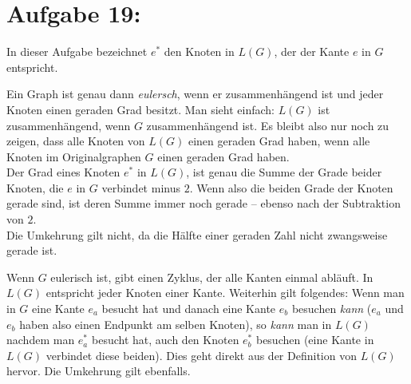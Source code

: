 \documentclass[11pt]{scrartcl} %
\begin{document}
\newpage
\section*{Aufgabe 19:}
In dieser Aufgabe bezeichnet $e^*$ den Knoten in $L(G)$, der der Kante $e$ in $G$ entspricht.

\begin{compactenum}[(a)]
\item Ein Graph ist genau dann \emph{eulersch}, wenn er zusammenhängend ist und jeder Knoten einen geraden Grad besitzt. Man sieht einfach: $L(G)$ ist zusammenhängend, wenn $G$ zusammenhängend ist. Es bleibt also nur noch zu zeigen, dass alle Knoten von $L(G)$ einen geraden Grad haben, wenn alle Knoten im Originalgraphen $G$ einen geraden Grad haben.\\
Der Grad eines Knoten $e^*$ in $L(G)$, ist genau die Summe der Grade beider Knoten, die $e$ in $G$ verbindet minus $2$. Wenn also die beiden Grade der Knoten gerade sind, ist deren Summe immer noch gerade -- ebenso nach der Subtraktion von $2$.\\
Die Umkehrung gilt nicht, da die Hälfte einer geraden Zahl nicht zwangsweise gerade ist.\\

\item Wenn $G$ eulerisch ist, gibt einen Zyklus, der alle Kanten einmal abläuft. In $L(G)$ entspricht jeder Knoten einer Kante. Weiterhin gilt folgendes: Wenn man in $G$ eine Kante $e_a$ besucht hat und danach eine Kante $e_b$ besuchen \emph{kann} ($e_a$ und $e_b$ haben also einen Endpunkt am selben Knoten), so \emph{kann} man in $L(G)$ nachdem man $e_a^*$ besucht hat, auch den Knoten $e_b^*$ besuchen (eine Kante in $L(G)$ verbindet diese beiden). Dies geht direkt aus der Definition von $L(G)$ hervor. Die Umkehrung gilt ebenfalls.

\end{compactenum}
\end{document}
